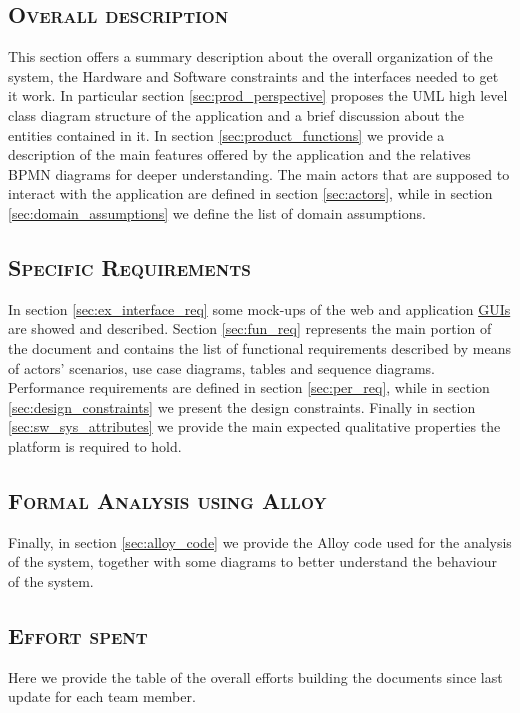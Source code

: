\subsection*{\textsc{\textcolor{myblue}{ Overall description}}}
This section offers a summary description about the overall organization of the system, the Hardware and Software constraints and the interfaces needed to get it work. In particular section \ref{sec:prod_perspective} proposes the UML high level class diagram structure of the application and a brief discussion about the entities contained in it. In section \ref{sec:product_functions} we provide a description of the main features offered by the application and the relatives BPMN diagrams for deeper understanding. The main actors that are supposed to interact with the application are defined in section \ref{sec:actors}, while in section \ref{sec:domain_assumptions} we define the list of domain assumptions.
\subsection*{\textsc{\textcolor{myblue}{ Specific Requirements}}}
In section \ref{sec:ex_interface_req} some mock-ups of the web and application \hyperref[tab:acronymsTable]{GUIs} are showed and described. Section \ref{sec:fun_req} represents the main portion of the document and contains the list of functional requirements described by means of actors' scenarios, use case diagrams, tables and sequence diagrams. Performance requirements are defined in section \ref{sec:per_req}, while in section \ref{sec:design_constraints} we present the design constraints. Finally in section \ref{sec:sw_sys_attributes} we provide the main expected qualitative properties the platform is required to hold.
\subsection*{\textsc{\textcolor{myblue}{ Formal Analysis using Alloy}}}
Finally, in section \ref{sec:alloy_code} we provide the Alloy code used for the analysis of the system, together with some diagrams to better understand the behaviour of the system.

\subsection*{\textsc{\textcolor{myblue}{ Effort spent}}}
Here we provide the table of the overall efforts building the documents since last update for each team member.

